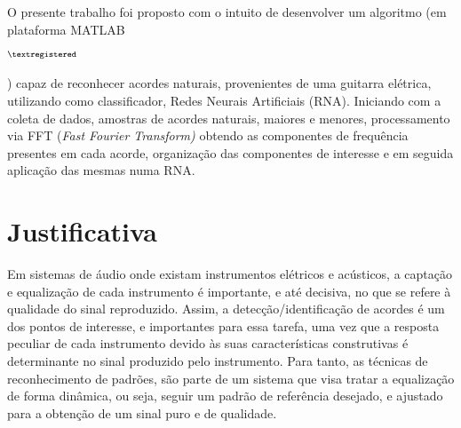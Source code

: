 
O presente trabalho foi proposto com o intuito de desenvolver um algoritmo (em plataforma MATLAB\begin{footnotesize}$^{\textregistered}$\end{footnotesize}) capaz de reconhecer acordes naturais, provenientes de uma guitarra elétrica, utilizando como classificador, Redes Neurais Artificiais (RNA). Iniciando com a coleta de dados, amostras de acordes naturais, maiores e menores, processamento via FFT (\textit{Fast Fourier Transform)} obtendo as componentes de frequência presentes em cada acorde, organização das componentes de interesse e em seguida aplicação das mesmas numa RNA.

\section{Justificativa}

Em sistemas de áudio onde existam instrumentos elétricos e acústicos,  a captação e equalização de cada  instrumento  é  importante,  e  até  decisiva,  no  que  se  refere  à  qualidade  do  sinal  reproduzido.  Assim,  a  detecção/identificação  de  acordes  é  um  dos  pontos  de  interesse,  e  importantes  para  essa tarefa, uma vez que a resposta peculiar de cada instrumento devido às suas características construtivas é determinante no sinal produzido pelo instrumento. Para tanto,  as técnicas de reconhecimento de padrões, são parte de um sistema que visa tratar a equalização de forma dinâmica, ou seja, seguir  um  padrão  de  referência  desejado,  e  ajustado  para a  obtenção  de  um  sinal  puro  e  de  qualidade.

